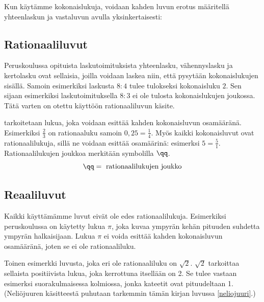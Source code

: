 %

Kun käytämme kokonaislukuja, voidaan kahden luvun erotus määritellä
yhteenlaskun ja vastaluvun avulla yksinkertaisesti:

\laatikko{
\[m-n = m+(-n)\]
}

\subsection*{Rationaaliluvut}

Peruskoulussa opituista laskutoimituksista yhteenlasku, vähennyslasku ja kertolasku ovat sellaisia, joilla voidaan laskea niin, että pysytään kokonaislukujen sisällä. Samoin esimerkiksi laskusta $8:4$ tulee tulokseksi kokonaisluku $2$. Sen sijaan esimerkiksi laskutoimituksella $8:3$ ei ole tulosta kokonaislukujen joukossa. Tätä varten on otettu käyttöön rationaaliluvun käsite.

 tarkoitetaan lukua, joka voidaan esittää kahden kokonaisluvun osamääränä. Esimerkiksi $\frac{2}{3}$ on rationaaluku samoin $0,25=\frac{1}{4}$. Myös kaikki kokonaisluvut ovat rationaalilukuja, sillä ne voidaan esittää osamäärinä: esimerksi $5=\frac{5}{1}$. Rationaalilukujen joukkoa merkitään symbolilla $\qq$. \[\qq= \text{ rationaalilukujen joukko} \]    


\subsection*{Reaaliluvut}

Kaikki käyttämämme luvut eivät ole edes rationaalilukuja. Esimerkiksi peruskoulussa on käytetty lukua $\pi$, joka kuvaa ympyrän kehän pituuden suhdetta ympyrän halkaisijaan. Lukua $\pi$ ei voida esittää kahden kokonaisluvun osamääränä, joten se ei ole rationaaliluku.

Toinen esimerkki luvusta, joka eri ole rationaaliluku on $\sqrt{2}$. $\sqrt{2}$ tarkoittaa sellaista positiivista lukua, joka kerrottuna itsellään on 2. Se tulee vastaan esimerksi suorakulmaisessa kolmiossa, jonka kateetit ovat pituudeltaan 1. (Neliöjuuren käsitteestä puhutaan tarkemmin tämän kirjan luvussa \ref{neliojuuri}.)

